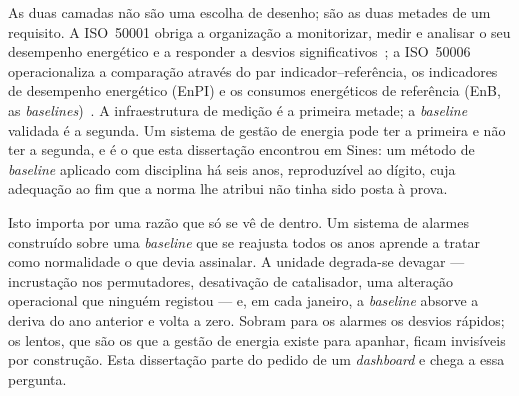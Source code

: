 As duas camadas não são uma escolha de desenho; são as duas metades de
um requisito. A ISO~50001 obriga a organização a monitorizar, medir e
analisar o seu desempenho energético e a responder a desvios
significativos~\cite[\S9.1]{ISO50001_2018}; a ISO~50006 operacionaliza a
comparação através do par indicador--referência, os indicadores de
desempenho energético (EnPI) e os consumos energéticos de referência
(EnB, as \emph{baselines})~\cite{ISO50006_2014}. A infraestrutura de
medição é a primeira metade; a \emph{baseline} validada é a segunda. Um
sistema de gestão de energia pode ter a primeira e não ter a segunda, e
é o que esta dissertação encontrou em Sines: um método de
\emph{baseline} aplicado com disciplina há seis anos, reproduzível ao
dígito, cuja adequação ao fim que a norma lhe atribui não tinha sido
posta à prova.


Isto importa por uma razão que só se vê de dentro. Um sistema de alarmes
construído sobre uma \emph{baseline} que se reajusta todos os anos
aprende a tratar como normalidade o que devia assinalar. A unidade
degrada-se devagar --- incrustação nos permutadores, desativação de
catalisador, uma alteração operacional que ninguém registou --- e, em
cada janeiro, a \emph{baseline} absorve a deriva do ano anterior e volta
a zero. Sobram para os alarmes os desvios rápidos; os lentos, que são
os que a gestão de energia existe para apanhar, ficam invisíveis por
construção. Esta dissertação parte do pedido de um \emph{dashboard} e
chega a essa pergunta.

